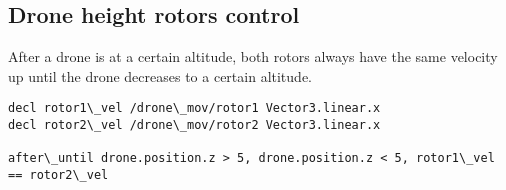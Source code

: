 \subsection{Drone height rotors control}
\label{ssec:rotorsexample}

After a drone is at a certain altitude, both rotors always have the same velocity up until the drone decreases to a certain altitude.

\begin{lstlisting}
decl rotor1\_vel /drone\_mov/rotor1 Vector3.linear.x
decl rotor2\_vel /drone\_mov/rotor2 Vector3.linear.x

after\_until drone.position.z > 5, drone.position.z < 5, rotor1\_vel == rotor2\_vel
\end{lstlisting}
